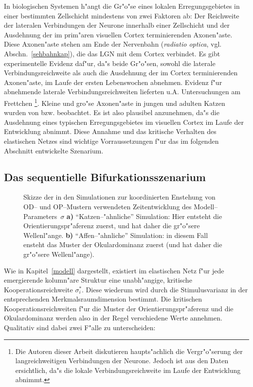 In biologischen Systemen h"angt die Gr"o"se eines lokalen Erregungsgebietes
in einer bestimmten Zellschicht mindestens von zwei Faktoren ab: Der
Reichweite der lateralen Verbindungen der Neurone innerhalb einer
Zellschicht und der Ausdehnung der im prim"aren visuellen Cortex
terminierenden Axonen"aste.  Diese Axonen"aste stehen am Ende der
Nervenbahn (\emph{radiatio optica}, vgl. Abschn.~\ref{sehbahnkap}), die das
LGN mit dem Cortex verbindet.  Es gibt experimentelle Evidenz daf"ur, da"s
beide Gr"o"sen, sowohl die laterale Verbindungsreichweite als auch die
Ausdehnung der im Cortex terminierenden Axonen"aste, im Laufe der ersten
Lebenswochen abnehmen. Evidenz f"ur abnehmende laterale
Verbindungsreichweiten lieferten u.A. Untersuchungen am Frettchen
\cite{katz:1994}\footnote{Die Autoren dieser Arbeit diskutieren haupts"achlich
die Vergr"o"serung der langreichweitigen Verbindungen der Neurone. Jedoch
ist aus den Daten ersichtlich, da"s die lokale Verbindungsreichweite im
Laufe der Entwicklung abnimmt.}. Kleine und gro"se Axonen"aste in jungen und
adulten Katzen wurden von 
bzw.  beobachtet.  Es ist also plausibel anzunehmen,
da"s die Ausdehnung eines typischen Erregungsgebietes im visuellen Cortex
im Laufe der Entwicklung abnimmt. Diese Annahme und das kritische Verhalten
des elastischen Netzes sind wichtige Vorraussetzungen f"ur das im folgenden
Abschnitt entwickelte Szenarium.
\setcounter{footnote}{1}

\subsection{Das sequentielle Bifurkationsszenarium}

\begin{figure}[t]
\begin{center}
\caption{Skizze der in den Simulationen zur koordinierten Enstehung von
OD-- und OP--Mustern verwendeten Zeitentwicklung des
Modell--Parameters~$\sigma$ \textbf{a)} ``Katzen--"ahnliche'' Simulation:
Hier entsteht die Orientierungspr"aferenz zuerst, und hat daher die
gr"o"sere Wellenl"ange. \textbf{b)} ``Affen--"ahnliche'' Simulation: in
diesem Fall ensteht das Muster der Okulardominanz zuerst (und hat daher die
gr"o"sere Wellenl"ange).}
\label{zeitentwicklung}
\end{center}
\end{figure}

Wie in Kapitel~\ref{modell} dargestellt, existiert im elastischen Netz f"ur
jede emergierende kolumn"are Struktur eine unabh"angige, kritische
Kooperationsreichweite $\sigma_i^\ast$.  Diese wiederum wird durch die
Stimulusvarianz  in der entsprechenden Merkmalsraumdimension bestimmt. Die
kritischen Kooperationsreichweiten f"ur die Muster der
Orientierungspr"aferenz und die Okulardominanz werden also in der Regel
verschiedene Werte annehmen. Qualitativ sind dabei zwei F"alle zu
unterscheiden:

